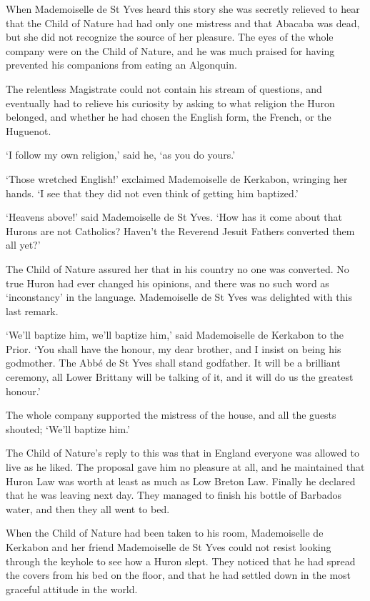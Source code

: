\documentclass{article}
\begin{document}
\begin{center}
When Mademoiselle de St Yves heard this story she was secretly relieved to hear 
that the Child of Nature had had only one mistress and that Abacaba was dead, but 
she did not recognize the source of her pleasure. The eyes of the whole company 
were on the Child of Nature, and he was much praised for having prevented his companions 
from eating an Algonquin. 

The relentless Magistrate could not contain his stream of questions, and eventually 
had to relieve his curiosity by asking to what religion the Huron belonged, and 
whether he had chosen the English form, the French, or the Huguenot. 

`I follow my own religion,' said he, `as you do yours.' 

`Those wretched English!' exclaimed Mademoiselle de Kerkabon, wringing her hands. 
`I see that they did not even think of getting him baptized.' 

`Heavens above!' said Mademoiselle de St Yves. `How has it come about that Hurons 
are not Catholics? Haven't the Reverend Jesuit Fathers converted them all yet?' 

The Child of Nature assured her that in his country no one was converted. No true 
Huron had ever changed his opinions, and there was no such word as `inconstancy' 
in the language. Mademoiselle de St Yves was delighted with this last remark. 

`We'll baptize him, we'll baptize him,' said Mademoiselle de Kerkabon to the Prior. 
`You shall have the honour, my dear brother, and I insist on being his godmother. 
The Abbé de St Yves shall stand godfather. It will be a brilliant ceremony, all 
Lower Brittany will be talking of it, and it will do us the greatest honour.' 

The whole company supported the mistress of the house, and all the guests shouted; 
`We'll baptize him.' 

The Child of Nature's reply to this was that in England everyone was allowed to 
live as he liked. The proposal gave him no pleasure at all, and he maintained that 
Huron Law was worth at least as much as Low Breton Law. Finally he declared that 
he was leaving next day. They managed to finish his bottle of Barbados water, and 
then they all went to bed. 

When the Child of Nature had been taken to his room, Mademoiselle de Kerkabon and 
her friend Mademoiselle de St Yves could not resist looking through the keyhole 
to see how a Huron slept. They noticed that he had spread the covers from his bed 
on the floor, and that he had settled down in the most graceful attitude in the 
world.\pagebreak{} 


\end{center}
\end{document}
